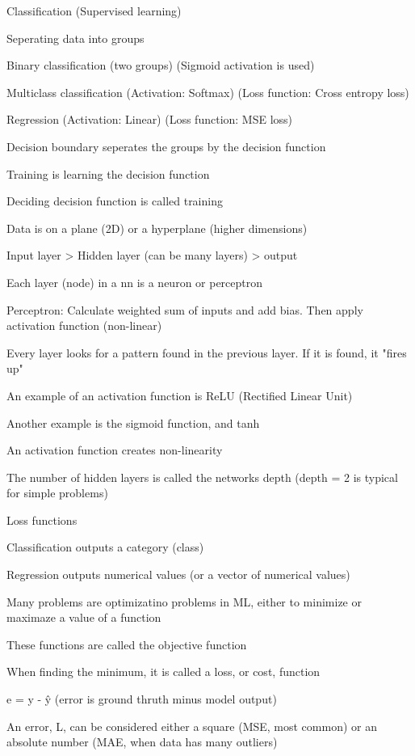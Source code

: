 Classification (Supervised learning)

	Seperating data into groups

	Binary classification (two groups) (Sigmoid activation is used)

	Multiclass classification (Activation: Softmax) (Loss function: Cross entropy loss)

	Regression (Activation: Linear) (Loss function: MSE loss)

	Decision boundary seperates the groups by the decision function

	Training is learning the decision function

	Deciding decision function is called training

	Data is on a plane (2D) or a hyperplane (higher dimensions)

	Input layer > Hidden layer (can be many layers) > output

	Each layer (node) in a nn is a neuron or perceptron

	Perceptron: Calculate weighted sum of inputs and add bias. Then apply activation function (non-linear)

	Every layer looks for a pattern found in the previous layer. If it is found, it "fires up"

	An example of an activation function is ReLU (Rectified Linear Unit)

	Another example is the sigmoid function, and tanh

	An activation function creates non-linearity

	The number of hidden layers is called the networks depth (depth = 2 is typical for simple problems)

Loss functions

	Classification outputs a category (class)

	Regression outputs numerical values (or a vector of numerical values)

	Many problems are optimizatino problems in ML, either to minimize or maximaze a value of a function

	These functions are called the objective function

	When finding the minimum, it is called a loss, or cost, function

	e = y - \^y (error is ground thruth minus model output)

	An error, L, can be considered either a square (MSE, most common) or an absolute number (MAE, when data has many outliers)

